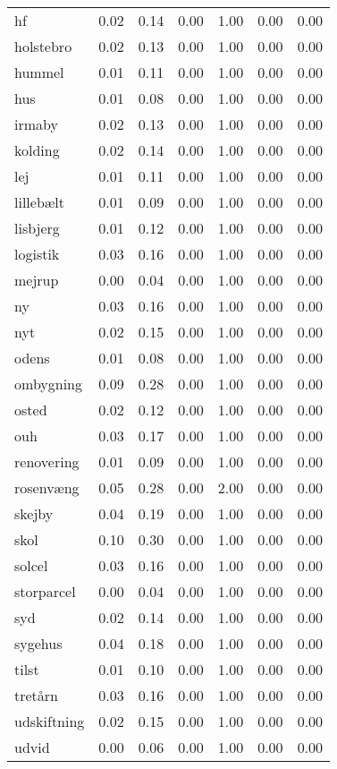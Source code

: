 \begin{landscape}
\begin{longtable}[h!]{lllllll}
hf & 0.02 & 0.14 & 0.00 & 1.00 & 0.00 & 0.00 \\
holstebro & 0.02 & 0.13 & 0.00 & 1.00 & 0.00 & 0.00 \\
hummel & 0.01 & 0.11 & 0.00 & 1.00 & 0.00 & 0.00 \\
hus & 0.01 & 0.08 & 0.00 & 1.00 & 0.00 & 0.00 \\
irmaby & 0.02 & 0.13 & 0.00 & 1.00 & 0.00 & 0.00 \\
kolding & 0.02 & 0.14 & 0.00 & 1.00 & 0.00 & 0.00 \\
lej & 0.01 & 0.11 & 0.00 & 1.00 & 0.00 & 0.00 \\
lillebælt & 0.01 & 0.09 & 0.00 & 1.00 & 0.00 & 0.00 \\
lisbjerg & 0.01 & 0.12 & 0.00 & 1.00 & 0.00 & 0.00 \\
logistik & 0.03 & 0.16 & 0.00 & 1.00 & 0.00 & 0.00 \\
mejrup & 0.00 & 0.04 & 0.00 & 1.00 & 0.00 & 0.00 \\
ny & 0.03 & 0.16 & 0.00 & 1.00 & 0.00 & 0.00 \\
nyt & 0.02 & 0.15 & 0.00 & 1.00 & 0.00 & 0.00 \\
odens & 0.01 & 0.08 & 0.00 & 1.00 & 0.00 & 0.00 \\
ombygning & 0.09 & 0.28 & 0.00 & 1.00 & 0.00 & 0.00 \\
osted & 0.02 & 0.12 & 0.00 & 1.00 & 0.00 & 0.00 \\
ouh & 0.03 & 0.17 & 0.00 & 1.00 & 0.00 & 0.00 \\
renovering & 0.01 & 0.09 & 0.00 & 1.00 & 0.00 & 0.00 \\
rosenvæng & 0.05 & 0.28 & 0.00 & 2.00 & 0.00 & 0.00 \\
skejby & 0.04 & 0.19 & 0.00 & 1.00 & 0.00 & 0.00 \\
skol & 0.10 & 0.30 & 0.00 & 1.00 & 0.00 & 0.00 \\
solcel & 0.03 & 0.16 & 0.00 & 1.00 & 0.00 & 0.00 \\
storparcel & 0.00 & 0.04 & 0.00 & 1.00 & 0.00 & 0.00 \\
syd & 0.02 & 0.14 & 0.00 & 1.00 & 0.00 & 0.00 \\
sygehus & 0.04 & 0.18 & 0.00 & 1.00 & 0.00 & 0.00 \\
tilst & 0.01 & 0.10 & 0.00 & 1.00 & 0.00 & 0.00 \\
tretårn & 0.03 & 0.16 & 0.00 & 1.00 & 0.00 & 0.00 \\
udskiftning & 0.02 & 0.15 & 0.00 & 1.00 & 0.00 & 0.00 \\
udvid & 0.00 & 0.06 & 0.00 & 1.00 & 0.00 & 0.00 \\

\end{longtable}
\end{landscape}
